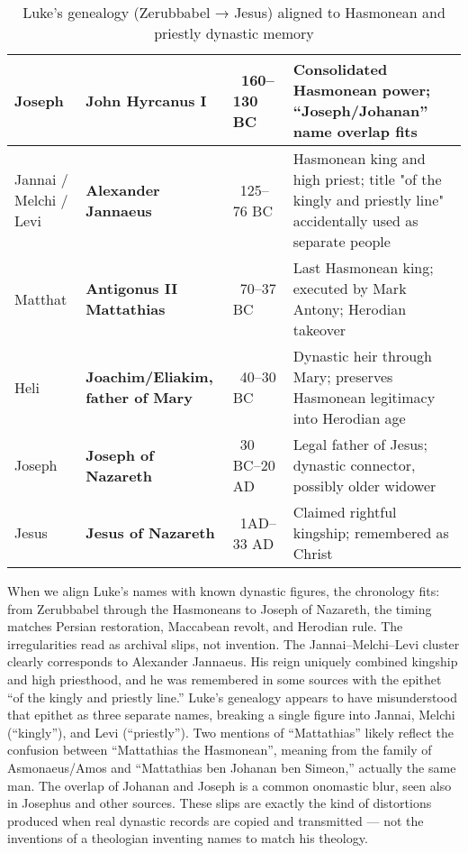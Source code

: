 \begin{table}[h]
\begin{tabular}{|l|p{3.4cm}|p{2.8cm}|p{6.6cm}|}
        Joseph & \textbf{John Hyrcanus I} & ~160–130 BC & Consolidated Hasmonean power; “Joseph/Johanan” name overlap fits \\ \hline
        Jannai / Melchi / Levi & \textbf{Alexander Jannaeus} & ~125–76 BC & Hasmonean king and high priest; title "of the kingly and priestly line" accidentally used as separate people \\ \hline
        Matthat & \textbf{Antigonus II Mattathias} & ~70–37 BC & Last Hasmonean king; executed by Mark Antony; Herodian takeover \\ \hline
        Heli & \textbf{Joachim/Eliakim, father of Mary} & ~40–30 BC & Dynastic heir through Mary; preserves Hasmonean legitimacy into Herodian age \\ \hline
        Joseph & \textbf{Joseph of Nazareth} & ~30 BC–20 AD & Legal father of Jesus; dynastic connector, possibly older widower \\ \hline
        Jesus & \textbf{Jesus of Nazareth} & ~1AD–33 AD & Claimed rightful kingship; remembered as Christ \\ \hline
    \end{tabular}
    \caption{Luke’s genealogy (Zerubbabel → Jesus) aligned to Hasmonean and priestly dynastic memory}
    \label{tab:luke_corrected}
\end{table}

When we align Luke’s names with known dynastic figures, the chronology fits: from Zerubbabel through the Hasmoneans to Joseph of Nazareth, the timing matches Persian restoration, Maccabean revolt, and Herodian rule.
The irregularities read as archival slips, not invention.
The Jannai–Melchi–Levi cluster clearly corresponds to Alexander Jannaeus.
His reign uniquely combined kingship and high priesthood, and he was remembered in some sources with the epithet ``of the kingly and priestly line.''
Luke’s genealogy appears to have misunderstood that epithet as three separate names, breaking a single figure into Jannai, Melchi (``kingly''), and Levi (``priestly'').
Two mentions of ``Mattathias'' likely reflect the confusion between ``Mattathias the Hasmonean'', meaning from the family of Asmonaeus/Amos and ``Mattathias ben Johanan ben Simeon,'' actually the same man.
The overlap of Johanan and Joseph is a common onomastic blur, seen also in Josephus and other sources.
These slips are exactly the kind of distortions produced when real dynastic records are copied and transmitted — not the inventions of a theologian inventing names to match his theology.


